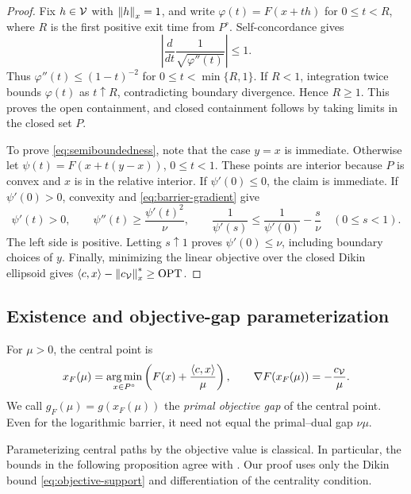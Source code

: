 \begin{proof}
Fix $h\in\mathcal V$ with $\left\lVert h\right\rVert_x=1$, and write
$\varphi(t)=F(x+th)$ for $0\leq t<R$, where $R$ is the first positive
exit time from $P^\circ$. Self-concordance gives
\begin{equation}
 \left|\frac{d}{dt}\frac1{\sqrt{\varphi''(t)}}\right|\leq1.
 \label{eq:line-hessian}
\end{equation}
Thus $\varphi''(t)\leq(1-t)^{-2}$ for $0\leq t<\min\{R,1\}$.
If $R<1$, integration twice bounds $\varphi(t)$ as $t\uparrow R$,
contradicting boundary divergence. Hence $R\geq1$. This proves the open
containment, and closed containment follows by taking limits in the closed
set $P$.

To prove \eqref{eq:semiboundedness}, note that the case $y=x$ is
immediate. Otherwise let $\psi(t)=F(x+t(y-x))$, $0\leq t<1$. These points
are interior because $P$ is convex and $x$ is in the relative interior.
If $\psi'(0)\leq0$, the claim is immediate. If $\psi'(0)>0$,
convexity and \eqref{eq:barrier-gradient} give
\[
 \psi'(t)>0,\qquad
 \psi''(t)\geq\frac{\psi'(t)^2}{\nu},\qquad
 \frac1{\psi'(s)}\leq\frac1{\psi'(0)}-\frac{s}{\nu}
 \quad(0\leq s<1).
\]
The left side is positive. Letting $s\uparrow1$ proves
$\psi'(0)\leq\nu$, including boundary choices of $y$.
Finally, minimizing the linear objective over the closed Dikin ellipsoid
gives $\left\langle c,x\right\rangle-\left\lVert c_{\mathcal V}\right\rVert_x^*\geq\operatorname{OPT}$.
\end{proof}

\subsection{Existence and objective-gap parameterization}

For $\mu>0$, the central point is
\begin{equation}
 x_F(\mu)=\operatorname*{arg\,min}_{x\in P^\circ}
       \left(F(x)+\frac{\left\langle c,x\right\rangle}{\mu}\right),
 \qquad \nabla F(x_F(\mu))=-\frac{c_{\mathcal V}}{\mu}.
 \label{eq:central-path}
\end{equation}
We call $g_F(\mu)=g(x_F(\mu))$ the \emph{primal objective gap} of the
central point. Even for the logarithmic barrier, it need not equal the
primal--dual gap $\nu\mu$.

Parameterizing central paths by the objective value is classical.
In particular, the bounds in the following proposition agree with
\citet[Proposition 3.2]{pena2002}. Our proof uses only the Dikin bound
\eqref{eq:objective-support} and differentiation of the centrality
condition.

